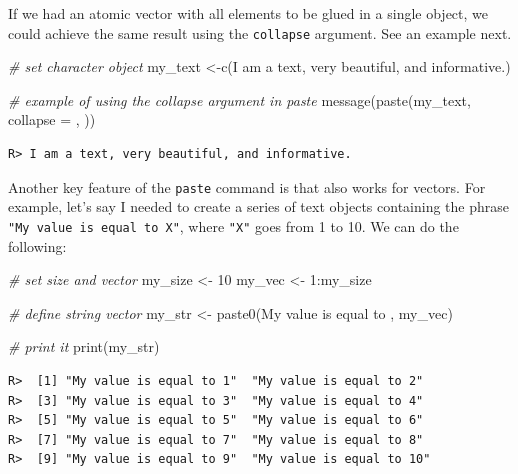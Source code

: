 \documentclass[
  12pt,
]{book}
\newenvironment{Shaded}{\begin{snugshade}}{\end{snugshade}}
\newcommand{\AttributeTok}[1]{\textcolor[rgb]{0.61,0.61,0.61}{#1}}
\newcommand{\CommentTok}[1]{\textcolor[rgb]{0.37,0.37,0.37}{\textit{#1}}}
\newcommand{\DecValTok}[1]{\textcolor[rgb]{0.06,0.06,0.06}{#1}}
\newcommand{\FunctionTok}[1]{\textcolor[rgb]{0,0,0}{#1}}
\newcommand{\NormalTok}[1]{#1}
\newcommand{\OtherTok}[1]{\textcolor[rgb]{0.37,0.37,0.37}{#1}}
\newcommand{\SpecialCharTok}[1]{\textcolor[rgb]{0,0,0}{#1}}
\newcommand{\StringTok}[1]{\textcolor[rgb]{0.5,0.5,0.5}{#1}}
\begin{document}
If we had an atomic vector with all elements to be glued in a single object, we could achieve the same result using the \texttt{collapse} argument. See an example next.

\begin{Shaded}
\begin{Highlighting}[]
\CommentTok{\# set character object}
\NormalTok{my\_text }\OtherTok{\textless{}{-}}\FunctionTok{c}\NormalTok{(}\StringTok{\textquotesingle{}I am a text\textquotesingle{}}\NormalTok{, }\StringTok{\textquotesingle{}very beautiful\textquotesingle{}}\NormalTok{, }\StringTok{\textquotesingle{}and informative.\textquotesingle{}}\NormalTok{)}

\CommentTok{\# example of using the collapse argument in paste}
\FunctionTok{message}\NormalTok{(}\FunctionTok{paste}\NormalTok{(my\_text, }\AttributeTok{collapse =} \StringTok{\textquotesingle{}, \textquotesingle{}}\NormalTok{))}
\end{Highlighting}
\end{Shaded}

\begin{verbatim}
R> I am a text, very beautiful, and informative.
\end{verbatim}

Another key feature of the \texttt{paste} command is that also works for vectors. For example, let's say I needed to create a series of text objects containing the phrase \texttt{"My\ value\ is\ equal\ to\ X"}, where \texttt{"X"} goes from 1 to 10. We can do the following:

\begin{Shaded}
\begin{Highlighting}[]
\CommentTok{\# set size and vector}
\NormalTok{my\_size }\OtherTok{\textless{}{-}} \DecValTok{10}
\NormalTok{my\_vec }\OtherTok{\textless{}{-}} \DecValTok{1}\SpecialCharTok{:}\NormalTok{my\_size}

\CommentTok{\# define string vector}
\NormalTok{my\_str }\OtherTok{\textless{}{-}} \FunctionTok{paste0}\NormalTok{(}\StringTok{\textquotesingle{}My value is equal to \textquotesingle{}}\NormalTok{, my\_vec)}

\CommentTok{\# print it}
\FunctionTok{print}\NormalTok{(my\_str)}
\end{Highlighting}
\end{Shaded}

\begin{verbatim}
R>  [1] "My value is equal to 1"  "My value is equal to 2" 
R>  [3] "My value is equal to 3"  "My value is equal to 4" 
R>  [5] "My value is equal to 5"  "My value is equal to 6" 
R>  [7] "My value is equal to 7"  "My value is equal to 8" 
R>  [9] "My value is equal to 9"  "My value is equal to 10"
\end{verbatim}
\end{document}

